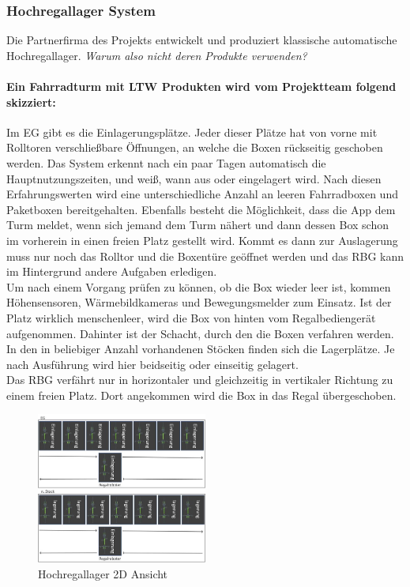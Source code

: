 \subsubsection{Hochregallager System}
Die Partnerfirma des Projekts entwickelt und produziert klassische automatische Hochregallager. \textit{Warum also nicht deren Produkte verwenden?}

\paragraph{Ein Fahrradturm mit LTW Produkten wird vom Projektteam folgend skizziert:}
Im EG gibt es die Einlagerungsplätze. Jeder dieser Plätze hat von vorne mit Rolltoren verschließbare Öffnungen, an welche die Boxen rückseitig geschoben werden. Das System erkennt nach ein paar Tagen automatisch die Hauptnutzungszeiten, und weiß, wann aus oder eingelagert wird. Nach diesen Erfahrungswerten wird eine unterschiedliche Anzahl an leeren Fahrradboxen und Paketboxen bereitgehalten. Ebenfalls besteht die Möglichkeit, dass die App dem Turm meldet, wenn sich jemand dem Turm nähert und dann dessen Box schon im vorherein in einen freien Platz gestellt wird. Kommt es dann zur Auslagerung muss nur noch das Rolltor und die Boxentüre geöffnet werden und das \ac{RBG} kann im Hintergrund andere Aufgaben erledigen.\\
Um nach einem Vorgang prüfen zu können, ob die Box wieder leer ist, kommen Höhensensoren, Wärmebildkameras und Bewegungsmelder zum Einsatz. Ist der Platz wirklich menschenleer, wird die Box von hinten vom Regalbediengerät aufgenommen. Dahinter ist der Schacht, durch den die Boxen verfahren werden. In den in beliebiger Anzahl vorhandenen Stöcken finden sich die Lagerplätze. Je nach Ausführung wird hier beidseitig oder einseitig gelagert.\\
Das \ac{RBG} verfährt nur in horizontaler und gleichzeitig in vertikaler Richtung zu einem freien Platz. Dort angekommen wird die Box in das Regal übergeschoben.

\begin{figure}[H]
    \centering
    \includegraphics[width=0.5\textwidth]{images/hochregallager2d.jpg}
    \caption{Hochregallager 2D Ansicht}
    \label{fig:hochregallager2d}
\end{figure}

